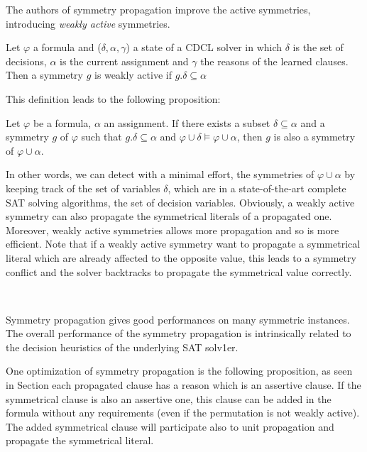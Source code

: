 
The authors of symmetry propagation improve the active symmetries, introducing \emph{weakly active} symmetries.

\begin{definition}
	\label{def:weakly_active_symmetry}
	Let $\varphi$ a formula and ($\delta, \alpha, \gamma$) a state of a CDCL solver in which $\delta$ is the set of decisions,
	$\alpha$ is the current assignment and $\gamma$ the reasons of the learned clauses. Then a symmetry $g$ is weakly active 
	if $g.\delta \subseteq \alpha$
\end{definition}

This definition leads to the following proposition:

\begin{proposition}
	Let $\varphi$ be a formula, $\alpha $ an assignment. If
	there exists a subset $\delta \subseteq \alpha $ and a symmetry $g$ of $\varphi$ such that 
	$g.\delta \subseteq \alpha $ and $\varphi \cup \delta \models \varphi \cup \alpha$, then $g$ 
	is also a symmetry of $\varphi \cup \alpha $.
\end{proposition}


In other words, we can detect with a minimal effort, the symmetries of $\varphi
\cup \alpha$ by keeping track of the set of variables $\delta$, which are 
in a state-of-the-art complete SAT solving algorithms, the set of decision variables.
Obviously, a weakly active symmetry can also propagate the symmetrical literals of a propagated one.
Moreover, weakly active symmetries allows more propagation and so is more efficient.
Note that if a weakly active symmetry want to propagate a symmetrical literal which are already affected to the 
opposite value, this leads to a symmetry conflict and the solver backtracks to propagate the symmetrical value correctly.

\\

Symmetry propagation gives good performances on many symmetric instances.
The overall performance of the symmetry propagation is intrinsically related to the decision heuristics of
the underlying SAT solv1er.

One optimization of symmetry propagation is the following proposition, as seen in Section
 each propagated clause has a reason which is an assertive clause.
If the symmetrical clause is also an assertive one, this clause can be added in the formula without any requirements
(even if the permutation is not weakly active). The added symmetrical clause will participate also to unit propagation and propagate the symmetrical literal.


